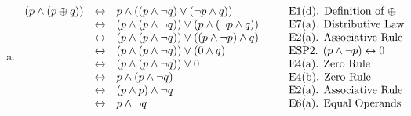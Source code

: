 \documentclass[12pt]{article}
\begin{document}
\begin{enumerate}[(a)]
		\item
			\[
				\begin{array}{lclcl}
					(p \wedge (p \oplus q)) & \leftrightarrow & p \wedge ((p \wedge \neg q) \vee (\neg p \wedge q))            & \hspace*{.1in} & \mbox{E1(d). Definition of $\oplus$}               \\
					                        & \leftrightarrow & (p \wedge (p \wedge \neg q)) \vee (p \wedge (\neg p \wedge q)) &                & \mbox{E7(a). Distributive Law}                     \\
					                        & \leftrightarrow & (p \wedge (p \wedge \neg q)) \vee ((p \wedge \neg p) \wedge q) &                & \mbox{E2(a). Associative Rule}                     \\
					                        & \leftrightarrow & (p \wedge (p \wedge \neg q)) \vee (0 \wedge q)                 &                & \mbox{ESP2. $(p \wedge \neg p) \leftrightarrow 0$} \\
					                        & \leftrightarrow & (p \wedge (p \wedge \neg q)) \vee 0                            &                & \mbox{E4(a). Zero Rule}                            \\
					                        & \leftrightarrow & p \wedge (p \wedge \neg q)                                     &                & \mbox{E4(b). Zero Rule}                            \\
					                        & \leftrightarrow & (p \wedge p) \wedge \neg q                                     &                & \mbox{E2(a). Associative Rule}                     \\
					                        & \leftrightarrow & p \wedge \neg q                                                &                & \mbox{E6(a). Equal Operands}
				\end{array}
			\]


\end{enumerate}
\end{document}

